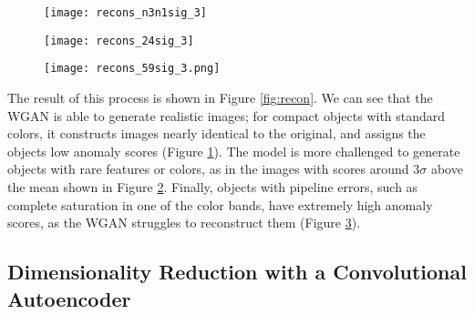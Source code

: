 \documentclass[fleqn,usenatbib,useAMS]{mnras}
\begin{document}
\begin{figure*}
\begin{subfigure}{.325\textwidth}
  \centering
  \texttt{[image: recons\_n3n1sig\_3]}  
  \caption{}
  \label{fig:recon_neg}
\end{subfigure}
\hfill
\begin{subfigure}{.325\textwidth}
  \centering
  \texttt{[image: recons\_24sig\_3]}  
  \caption{}
  \label{fig:recon_3sig}
\end{subfigure}
\hfill
\begin{subfigure}{.325\textwidth}
  \centering
  \texttt{[image: recons\_59sig\_3.png]}
  \caption{}
  \label{fig:recon_5sig}
\end{subfigure}
\caption{The results of WGAN image reconstruction and anomaly score assignment. The top row of each panel shows the original image, the second row shows the best WGAN reconstruction, and the bottom row shows the residual between the two. The assigned anomaly score is shown at the top of each column. The images in each panel are random samples of images in the following ranges of anomaly score: (a) significantly below the mean, (b) around $3\sigma$ above the mean, (c) greater than $5\sigma$ above the mean. It is clear that higher anomaly scores are indicative of poorer WGAN reconstructions and hence larger residuals.}
\label{fig:recon}
\end{figure*}

The result of this process is shown in Figure \ref{fig:recon}.
We can see that the WGAN is able to generate realistic images; for compact objects with standard colors, it constructs images nearly identical to the original, and assigns the objects low anomaly scores (Figure \ref{fig:recon_neg}).
The model is more challenged to generate objects with rare features or colors, as in the images with scores around $3\sigma$ above the mean shown in Figure \ref{fig:recon_3sig}.
Finally, objects with pipeline errors, such as complete saturation in one of the color bands, have extremely high anomaly scores, as the WGAN struggles to reconstruct them (Figure \ref{fig:recon_5sig}).

\subsection{Dimensionality Reduction with a Convolutional Autoencoder}
\label{sec:cae}
\end{document}
